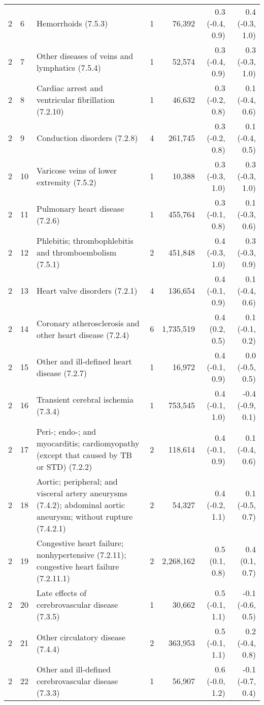 \begin{tabular}{llp{6.5cm}rrrr}
   2 &  6 & Hemorrhoids (7.5.3) &  1 & 76,392 & 0.3 (-0.4, 0.9) & 0.4 (-0.3, 1.0) \\ 
   2 &  7 & Other diseases of veins and lymphatics (7.5.4) &  1 & 52,574 & 0.3 (-0.4, 0.9) & 0.3 (-0.3, 1.0) \\ 
   2 &  8 & Cardiac arrest and ventricular fibrillation (7.2.10) &  1 & 46,632 & 0.3 (-0.2, 0.8) & 0.1 (-0.4, 0.6) \\ 
   2 &  9 & Conduction disorders (7.2.8) &  4 & 261,745 & 0.3 (-0.2, 0.8) & 0.1 (-0.4, 0.5) \\ 
   2 & 10 & Varicose veins of lower extremity (7.5.2) &  1 & 10,388 & 0.3 (-0.3, 1.0) & 0.3 (-0.3, 1.0) \\ 
   2 & 11 & Pulmonary heart disease (7.2.6) &  1 & 455,764 & 0.3 (-0.1, 0.8) & 0.1 (-0.3, 0.6) \\ 
   2 & 12 & Phlebitis; thrombophlebitis and thromboembolism (7.5.1) &  2 & 451,848 & 0.4 (-0.3, 1.0) & 0.3 (-0.3, 0.9) \\ 
   2 & 13 & Heart valve disorders (7.2.1) &  4 & 136,654 & 0.4 (-0.1, 0.9) & 0.1 (-0.4, 0.6) \\ 
   2 & 14 & Coronary atherosclerosis and other heart disease (7.2.4) &  6 & 1,735,519 & 0.4 (0.2, 0.5) & 0.1 (-0.1, 0.2) \\ 
   2 & 15 & Other and ill-defined heart disease (7.2.7) &  1 & 16,972 & 0.4 (-0.1, 0.9) & 0.0 (-0.5, 0.5) \\ 
   2 & 16 & Transient cerebral ischemia (7.3.4) &  1 & 753,545 & 0.4 (-0.1, 1.0) & -0.4 (-0.9, 0.1) \\ 
   2 & 17 & Peri-; endo-; and myocarditis; cardiomyopathy (except that caused by TB or STD) (7.2.2) &  2 & 118,614 & 0.4 (-0.1, 0.9) & 0.1 (-0.4, 0.6) \\ 
   2 & 18 & Aortic; peripheral; and visceral artery aneurysms (7.4.2); abdominal aortic aneurysm; without rupture (7.4.2.1) &  2 & 54,327 & 0.4 (-0.2, 1.1) & 0.1 (-0.5, 0.7) \\ 
   2 & 19 & Congestive heart failure; nonhypertensive (7.2.11); congestive heart failure (7.2.11.1) &  2 & 2,268,162 & 0.5 (0.1, 0.8) & 0.4 (0.1, 0.7) \\ 
   2 & 20 & Late effects of cerebrovascular disease (7.3.5) &  1 & 30,662 & 0.5 (-0.1, 1.1) & -0.1 (-0.6, 0.5) \\ 
   2 & 21 & Other circulatory disease (7.4.4) &  2 & 363,953 & 0.5 (-0.1, 1.1) & 0.2 (-0.4, 0.8) \\ 
   2 & 22 & Other and ill-defined cerebrovascular disease (7.3.3) &  1 & 56,907 & 0.6 (-0.0, 1.2) & -0.1 (-0.7, 0.4) \\ 

\end{tabular}
